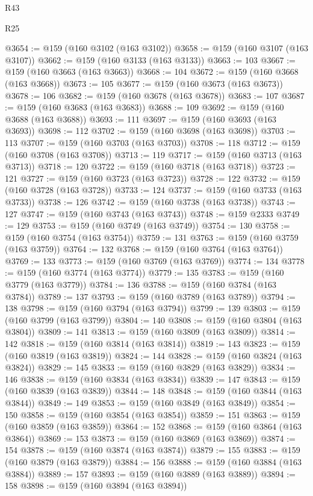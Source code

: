 \begin{lexlean}{R43}
\begin{lexlean}{R25}
\begin{coremodule}
{{{{{{{{{{{{{{{{{{{{{{{{{{{{{{{{{{{{{{{{{{{{{{{{{{{{{{{{{{{{{{{{{{{{{{{{{{{{{{{{{{{{{{{{{{{{{{{{{{{{{{{{{{{{{{{{{{{{{{{{{{{{{{{{{{{{{{{{{{{{{{{{{{{{{{{{{{{{{{{{{{{{{{{{{{{{{{{{{{{{{{{{{{{{{{{{{@3654 := @159 (@160 @3102 (@163 @3102))
@3658 := @159 (@160 @3107 (@163 @3107))
@3662 := @159 (@160 @3133 (@163 @3133))
@3663 := 103
@3667 := @159 (@160 @3663 (@163 @3663))
@3668 := 104
@3672 := @159 (@160 @3668 (@163 @3668))
@3673 := 105
@3677 := @159 (@160 @3673 (@163 @3673))
@3678 := 106
@3682 := @159 (@160 @3678 (@163 @3678))
@3683 := 107
@3687 := @159 (@160 @3683 (@163 @3683))
@3688 := 109
@3692 := @159 (@160 @3688 (@163 @3688))
@3693 := 111
@3697 := @159 (@160 @3693 (@163 @3693))
@3698 := 112
@3702 := @159 (@160 @3698 (@163 @3698))
@3703 := 113
@3707 := @159 (@160 @3703 (@163 @3703))
@3708 := 118
@3712 := @159 (@160 @3708 (@163 @3708))
@3713 := 119
@3717 := @159 (@160 @3713 (@163 @3713))
@3718 := 120
@3722 := @159 (@160 @3718 (@163 @3718))
@3723 := 121
@3727 := @159 (@160 @3723 (@163 @3723))
@3728 := 122
@3732 := @159 (@160 @3728 (@163 @3728))
@3733 := 124
@3737 := @159 (@160 @3733 (@163 @3733))
@3738 := 126
@3742 := @159 (@160 @3738 (@163 @3738))
@3743 := 127
@3747 := @159 (@160 @3743 (@163 @3743))
@3748 := @159 @2333
@3749 := 129
@3753 := @159 (@160 @3749 (@163 @3749))
@3754 := 130
@3758 := @159 (@160 @3754 (@163 @3754))
@3759 := 131
@3763 := @159 (@160 @3759 (@163 @3759))
@3764 := 132
@3768 := @159 (@160 @3764 (@163 @3764))
@3769 := 133
@3773 := @159 (@160 @3769 (@163 @3769))
@3774 := 134
@3778 := @159 (@160 @3774 (@163 @3774))
@3779 := 135
@3783 := @159 (@160 @3779 (@163 @3779))
@3784 := 136
@3788 := @159 (@160 @3784 (@163 @3784))
@3789 := 137
@3793 := @159 (@160 @3789 (@163 @3789))
@3794 := 138
@3798 := @159 (@160 @3794 (@163 @3794))
@3799 := 139
@3803 := @159 (@160 @3799 (@163 @3799))
@3804 := 140
@3808 := @159 (@160 @3804 (@163 @3804))
@3809 := 141
@3813 := @159 (@160 @3809 (@163 @3809))
@3814 := 142
@3818 := @159 (@160 @3814 (@163 @3814))
@3819 := 143
@3823 := @159 (@160 @3819 (@163 @3819))
@3824 := 144
@3828 := @159 (@160 @3824 (@163 @3824))
@3829 := 145
@3833 := @159 (@160 @3829 (@163 @3829))
@3834 := 146
@3838 := @159 (@160 @3834 (@163 @3834))
@3839 := 147
@3843 := @159 (@160 @3839 (@163 @3839))
@3844 := 148
@3848 := @159 (@160 @3844 (@163 @3844))
@3849 := 149
@3853 := @159 (@160 @3849 (@163 @3849))
@3854 := 150
@3858 := @159 (@160 @3854 (@163 @3854))
@3859 := 151
@3863 := @159 (@160 @3859 (@163 @3859))
@3864 := 152
@3868 := @159 (@160 @3864 (@163 @3864))
@3869 := 153
@3873 := @159 (@160 @3869 (@163 @3869))
@3874 := 154
@3878 := @159 (@160 @3874 (@163 @3874))
@3879 := 155
@3883 := @159 (@160 @3879 (@163 @3879))
@3884 := 156
@3888 := @159 (@160 @3884 (@163 @3884))
@3889 := 157
@3893 := @159 (@160 @3889 (@163 @3889))
@3894 := 158
@3898 := @159 (@160 @3894 (@163 @3894))
}}}}}}}}}}}}}}}}}}}}}}}}}}}}}}}}}}}}}}}}}}}}}}}}}}}}}}}}}}}}}}}}}}}}}}}}}}}}}}}}}}}}}}}}}}}}}}}}}}}}}}}}}}}}}}}}}}}}}}}}}}}}}}}}}}}}}}}}}}}}}}}}}}}}}}}}}}}}}}}}}}}}}}}}}}}}}}}}}}}}}}}}}}}}}}}}}
\end{coremodule}
\end{lexlean}
\end{lexlean}
